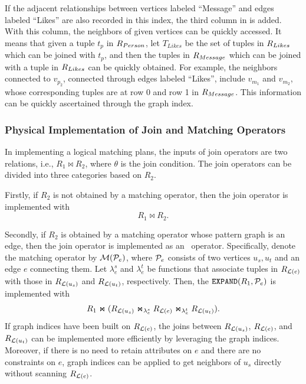 If the adjacent relationships between vertices labeled ``Message'' and edges labeled ``Likes'' are also recorded in this index, the third column in  is added.
With this column, the neighbors of given vertices can be quickly accessed.
It means that given a tuple $t_p$ in ${R_{Person}}$, let $T_{Likes}$ be the set of tuples in ${R_{Likes}}$ which can be joined with $t_p$, and then the tuples in ${R_{Message}}$ which can be joined with a tuple in ${R_{Likes}}$ can be quickly obtained.
For example, the neighbors connected to $v_{p_2}$, connected through edges labeled ``Likes'', include $v_{m_1}$ and $v_{m_2}$, whose corresponding tuples are at row 0 and row 1 in ${R_{Message}}$.
This information can be quickly ascertained through the graph index.

\subsubsection{Physical Implementation of Join and Matching Operators}
\label{sec:join-matching-operator}
In implementing a logical matching plans, the inputs of join operators are two relations, i.e., $R_1 \Join R_2$, where $\theta$ is the join condition.
The join operators can be divided into three categories based on $R_2$.

Firstly, if $R_2$ is not obtained by a matching operator, then the join operator is implemented with
\begin{equation*}
    R_1 \Join R_2.
\end{equation*}

Secondly, if $R_2$ is obtained by a matching operator whose pattern graph is an edge, then the join operator is implemented as an \expandvertex~operator.
Specifically, denote the matching operator by $\mathcal{M}(\mathcal{P}_e)$, where $\mathcal{P}_e$ consists of two vertices $u_s, u_t$ and an edge $e$ connecting them.
Let $\lambda^s_e$ and $\lambda^t_e$ be functions that associate tuples in ${R_{\mathcal{L}{(e)}}}$ with those in ${R_{\mathcal{L}(u_s)}}$ and ${R_{\mathcal{L}(u_t)}}$, respectively.
Then, the ${\texttt{EXPAND}}(R_1, \mathcal{P}_e)$ is implemented with
\begin{equation*}
    R_1 \Join ({R_{\mathcal{L}{(u_s)}}} \Join_{\lambda^{s}_{e}} {R_{\mathcal{L}{(e)}}} \Join_{\lambda^{t}_{e}} {R_{\mathcal{L}{(u_t)}}}).
\end{equation*}
If graph indices have been built on ${R_{\mathcal{L}(e)}}$, the joins between ${R_{\mathcal{L}(u_s)}}$, ${R_{\mathcal{L}(e)}}$, and ${R_{\mathcal{L}(u_t)}}$ can be implemented more efficiently by leveraging the graph indices.
Moreover, if there is no need to retain attributes on $e$ and there are no constraints on $e$, graph indices can be applied to get neighbors of $u_s$ directly without scanning ${R_{\mathcal{L}(e)}}$.

